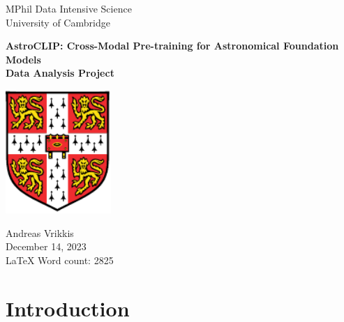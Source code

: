 \documentclass[a4paper,12pt]{article}
\begin{document}
    
    \vspace*{3cm}
    
    \begin{center}
     {\Large MPhil Data Intensive Science}  \\ [3pt]
     {\Large University of Cambridge}  \\ [3pt]
     
     \vspace*{1cm}
     \hrulefill
     \vspace*{0.75cm}
     
     {\LARGE \textbf{AstroCLIP: Cross-Modal Pre-training for Astronomical Foundation Models}} \\ [6pt]
     \large \textbf{Data Analysis Project} \\ [6pt]
     \vspace*{0.05cm}
     \hrulefill
     \vspace*{1.5cm}

    \includegraphics[width=0.3\textwidth]{../figures/University_Crest.pdf} 

    \vspace*{1.5cm}
     
     {\Large  Andreas Vrikkis} \\ [6pt]
     {\large  December 14, 2023} \\ [3pt]
     {\large  \LaTeX \hspace{0.03cm} Word count: 2825 } \\ [3pt]
     
     \end{center}   
    
    
    \newpage
    
    \restoregeometry
    
    \newpage
    
    \tableofcontents
    
    \newpage
\section{Introduction}
\end{document}

